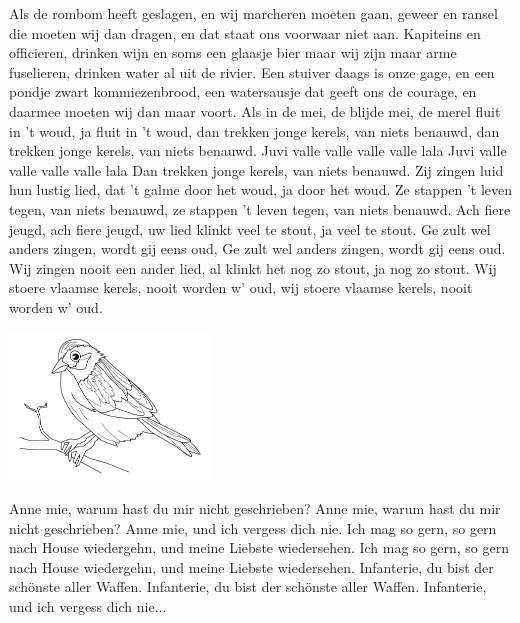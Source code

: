 \documentclass{article}
\begin{document}
\begin{songs}{}
\begin{intersong}
\end{intersong}
\beginverse
Als de rombom heeft geslagen, en wij marcheren moeten gaan, geweer en ransel die moeten wij dan dragen, en dat staat ons voorwaar niet aan. 
\endverse
\beginchorus
Kapiteins en officieren, drinken wijn en soms een glaasje bier maar wij zijn maar arme fuselieren, drinken water al uit de rivier.
\endchorus
\beginverse
Een stuiver daags is onze gage, en een pondje zwart kommiezenbrood, een watersausje dat geeft ons de courage, en daarmee moeten wij dan maar voort.
\endverse
\endsong
{}
\beginverse
Als in de mei, de blijde mei,
de merel fluit in 't woud,
ja fluit in 't woud,
dan trekken jonge kerels, 
van niets benauwd,
dan trekken jonge kerels, 
van niets benauwd.
\endverse
\beginchorus
Juvi valle valle valle valle lala
Juvi valle valle valle valle lala
Dan trekken jonge kerels, 
van niets benauwd.
\endchorus
\beginverse
Zij zingen luid hun lustig lied,
dat 't galme door het woud, 
ja door het woud.
Ze stappen 't leven tegen, 
van niets benauwd,
ze stappen 't leven tegen, 
van niets benauwd.
\endverse
\beginverse
Ach fiere jeugd, ach fiere jeugd,
uw lied klinkt veel te stout, 
ja veel te stout.
Ge zult wel anders zingen,
wordt gij eens oud,
Ge zult wel anders zingen,
wordt gij eens oud.
\endverse
\beginverse
Wij zingen nooit een ander lied,
al klinkt het nog zo stout,
ja nog zo stout.
Wij stoere vlaamse kerels, 
nooit worden w' oud,
wij stoere vlaamse kerels, 
nooit worden w' oud.
\endverse
\endsong
\begin{intersong}
    \includegraphics[width=0.4\textwidth]{img4}
\end{intersong}
\beginverse*
Anne mie, warum hast du mir nicht geschrieben?
Anne mie, warum hast du mir nicht geschrieben?
Anne mie, und ich vergess dich nie.
Ich mag so gern, so gern nach House wiedergehn, und meine Liebste wiedersehen.
Ich mag so gern, so gern nach House wiedergehn, und meine Liebste wiedersehen.
\endverse
\beginverse*
Infanterie, du bist der schönste aller Waffen.
Infanterie, du bist der schönste aller Waffen.
Infanterie, und ich vergess dich nie...
\endverse

\end{songs}
\end{document}
